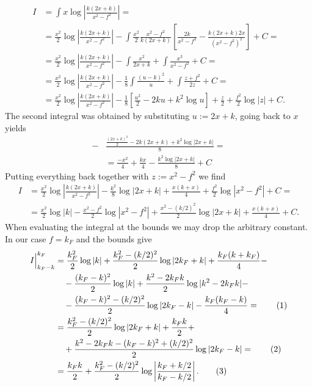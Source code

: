 \documentclass[english, parskip=full]{scrartcl}
\newcommand\numberthis{\addtocounter{equation}{1}\tag{\theequation}}
\newcommand{\klam}{}
\begin{document}
\begin{align}
I&= \int x\log \left\vert \frac{k(2x + k)}{x^2 - f^2} \right\vert = \\
&= \frac{x^2}{2} \log \left\vert \frac{k(2x + k)}{x^2 - f^2} \right\vert - \int \frac{x^2}{2} \frac{x^2 - f^2}{k(2x + k)} \klam\left[ \frac{2k}{x^2 - f^2} - \frac{k(2x + k)2x}{(x^2 - f^2)^2} \right] + C = \\
&= \frac{x^2}{2} \log \left\vert \frac{k(2x + k)}{x^2 - f^2} \right\vert  - \int \frac{x^2}{2x+k} + \int \frac{x^3}{x^2 - f^2} + C = \\
&= \frac{x^2}{2} \log \left\vert \frac{k(2x + k)}{x^2 - f^2} \right\vert - \frac{1}{8} \int \frac{(u - k)^2}{u} + \int \frac{z + f^2}{2z} + C = \\
&= \frac{x^2}{2} \log \left\vert \frac{k(2x + k)}{x^2 - f^2} \right\vert - \frac{1}{8} \klam\left[ \frac{u^2}{2} - 2ku + k^2 \log u \right] + \frac{z}{2} + \frac{f^2}{2} \log |z| + C.
\end{align}
The second integral was obtained by substituting $u := 2x + k$, going back to $x$ yields
\begin{align}
 - &\frac{\frac{(2x + k)^2}{2} - 2k(2x + k) + k^2 \log |2x + k|}{8} = \\
 &= \frac{-x^2}{4} + \frac{kx}{4} - \frac{k^2\log |2x + k|}{8} + C
\end{align}
Putting everything back together with $z := x^2 - f^2$ we find
\begin{align}
I &= \frac{x^2}{2} \log \left\vert \frac{k(2x + k)}{x^2 - f^2} \right\vert - \frac{ k^2 }{8}\log |2x + k|  + \frac{x(k+x)}{4} + \frac{f^2}{2} \log |x^2 - f^2| + C = \\
&= \frac{x^2}{2} \log |k| - \frac{x^2 - f^2}{2} \log |x^2 - f^2| + \frac{x^2 - (k/2)^2}{2}\log |2x+k| + \frac{x(k+x)}{4} + C.
\end{align}
When evaluating the integral at the bounds we may drop the arbitrary constant.
In our case $f=k_F$ and the bounds give
\begin{align*}
I\Big\vert_{k_F - k}^{k_F} &= \frac{k_F^2}{2}\log |k| + \frac{k_F^2 - (k/2)^2}{2} \log |2k_F + k| + \frac{k_F(k+k_F)}{4} - \\
&\quad -\frac{(k_F - k)^2}{2} \log |k| + \frac{k^2 - 2k_Fk}{2} \log |k^2 - 2k_Fk| - \\
&\quad - \frac{(k_F - k)^2 - (k/2)^2}{2} \log |2k_F - k| - \frac{k_F(k_F - k)}{4} = \numberthis \\
&= \frac{k_F^2 - (k/2)^2}{2} \log |2k_F + k| + \frac{k_Fk}{2} +\\
&\quad + \frac{k^2 - 2k_Fk - (k_F - k)^2 + (k/2)^2}{2} \log |2k_F - k| = \numberthis  \\
&= \frac{k_Fk}{2} + \frac{k_F^2 - (k/2)^2}{2} \log \left\vert \frac{k_F + k/2}{k_F - k/2} \right\vert. \numberthis 
\end{align*}
\end{document}
